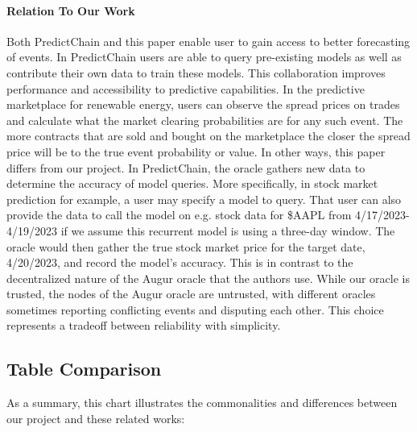 \documentclass{article}
\begin{document}
    \paragraph{Relation To Our Work}
    Both PredictChain and this paper enable user to gain access to better forecasting of events. In PredictChain users
    are able to query pre-existing models as well as contribute their own data to train these models. This collaboration
    improves performance and accessibility to predictive capabilities. In the predictive marketplace for renewable energy,
    users can observe the spread prices on trades and calculate what the market clearing probabilities are for any such
    event. The more contracts that are sold and bought on the marketplace the closer the spread price will be to the true
    event probability or value.  In other ways, this paper differs from our project. In PredictChain, the oracle gathers
    new data to determine the accuracy of model queries. More specifically, in stock market prediction for example, a
    user may specify a model to query. That user can also provide the data to call the model on e.g. stock data for
    \$AAPL from 4/17/2023-4/19/2023 if we assume this recurrent model is using a three-day window. The oracle would then
    gather the true stock market price for the target date, 4/20/2023, and record the model's accuracy.  This is in contrast
    to the decentralized nature of the Augur oracle that the authors use.  While our oracle is trusted, the nodes of
    the Augur oracle are untrusted, with different oracles sometimes reporting conflicting events and disputing each other.
    This choice represents a tradeoff between reliability with simplicity.


    \subsection{Table Comparison}

    As a summary, this chart illustrates the commonalities and differences between our project and these related works:
\end{document}
